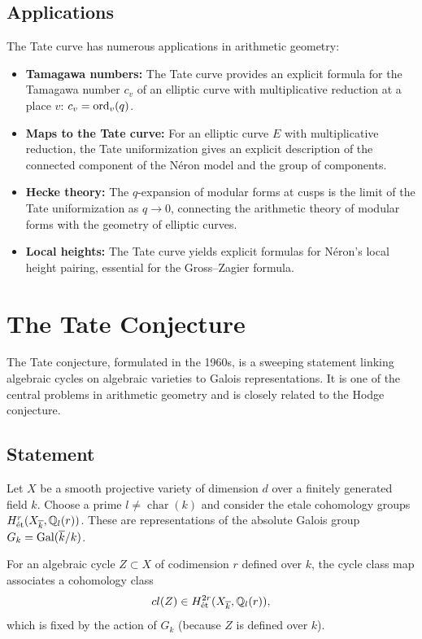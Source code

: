 \subsection{Applications}

The Tate curve has numerous applications in arithmetic geometry:
\begin{itemize}
    \item \textbf{Tamagawa numbers:} The Tate curve provides an explicit formula for the Tamagawa number \(c_v\) of an elliptic curve with multiplicative reduction at a place \(v\): \(c_v = \operatorname{ord}_v(q)\).
    \item \textbf{Maps to the Tate curve:} For an elliptic curve \(E\) with multiplicative reduction, the Tate uniformization gives an explicit description of the connected component of the N\'eron model and the group of components.
    \item \textbf{Hecke theory:} The \(q\)-expansion of modular forms at cusps is the limit of the Tate uniformization as \(q \to 0\), connecting the arithmetic theory of modular forms with the geometry of elliptic curves.
    \item \textbf{Local heights:} The Tate curve yields explicit formulas for N\'eron's local height pairing, essential for the Gross--Zagier formula.
\end{itemize}

\section{The Tate Conjecture}

The Tate conjecture, formulated in the 1960s, is a sweeping statement linking algebraic cycles on algebraic varieties to Galois representations. It is one of the central problems in arithmetic geometry and is closely related to the Hodge conjecture.

\subsection{Statement}

Let \(X\) be a smooth projective variety of dimension \(d\) over a finitely generated field \(k\). Choose a prime \(l \neq \operatorname{char}(k)\) and consider the etale cohomology groups \(H^r_{\text{\'et}}(X_{\overline{k}}, \mathbb{Q}_l(r))\). These are representations of the absolute Galois group \(G_k = \operatorname{Gal}(\overline{k}/k)\).

For an algebraic cycle \(Z \subset X\) of codimension \(r\) defined over \(k\), the cycle class map associates a cohomology class
\[
cl(Z) \in H^{2r}_{\text{\'et}}(X_{\overline{k}}, \mathbb{Q}_l(r)),
\]
which is fixed by the action of \(G_k\) (because \(Z\) is defined over \(k\)).


